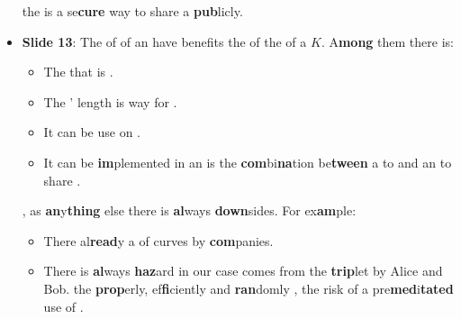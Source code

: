 \begin{itemize}
             the  is a se\textbf{cure} way to share a
             \textbf{pub}licly.

        \item \textbf{Slide 13}: The  of  of an  have  benefits
             the  of the
             of a  $K$.
            A\textbf{mong} them there is:
            \begin{itemize}
                \item The  that is 
                    .
                \item The ' length is way  for
                      .
                \item It can be use on .
                \item It can be \textbf{im}plemented in an   is the
                    \textbf{com}bi\textbf{na}tion be\textbf{tween} a  to 
                        and
                    an  to share
                    .
            \end{itemize}

            , as \textbf{an}y\textbf{thing} else there is \textbf{al}ways \textbf{down}sides. For ex\textbf{am}ple:
            \begin{itemize}
                \item There  al\textbf{read}y a  of curves
                     by \textbf{com}panies.
                \item There is \textbf{al}ways \textbf{haz}ard  in our case
                    comes from the
                    \textbf{trip}let   by Alice and Bob.  the 
                    \textbf{prop}erly, ef\textbf{fi}ciently and \textbf{ran}domly
                    ,
                     the
                    risk of a pre\textbf{med}i\textbf{tated} 
                    use of . 
            \end{itemize}
\end{itemize}

